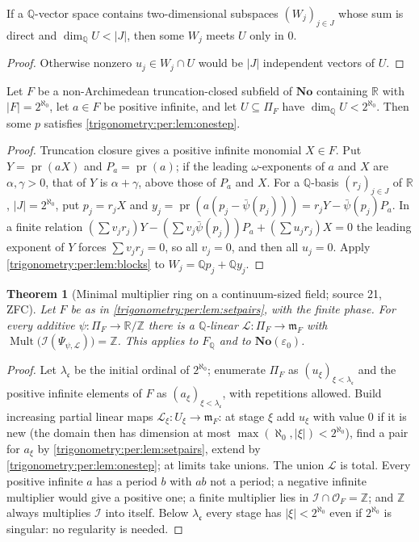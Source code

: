 \documentclass[11pt,letterpaper]{article}
\numberwithin{equation}{section}
\newtheorem{theorem}{Theorem}[section]
\theoremstyle{definition}
\theoremstyle{remark}
\newcommand{\No}{\mathbf{No}}
\newcommand{\R}{\mathbb R}
\newcommand{\Q}{\mathbb Q}
\newcommand{\Z}{\mathbb Z}
\newcommand{\OO}{\mathcal O}
\newcommand{\mm}{\mathfrak m}
\newcommand{\eps}{\varepsilon}
\newcommand{\Mult}{\operatorname{Mult}}
\newcommand{\pr}{\operatorname{pr}}
\newcommand{\cI}{\mathcal I}
\newcommand{\cL}{\mathcal L}
\begin{document}
\begin{lemma}\label{trigonometry:per:lem:blocks}
If a $\Q$-vector space contains two-dimensional subspaces $(W_j)_{j\in J}$ whose sum is direct and
$\dim_{\Q}U<|J|$, then some $W_j$ meets $U$ only in $0$.
\end{lemma}
\begin{proof}
Otherwise nonzero $u_j\in W_j\cap U$ would be $|J|$ independent vectors of $U$.
\end{proof}

\begin{lemma}\label{trigonometry:per:lem:setpairs}
Let $F$ be a non-Archimedean truncation-closed subfield of $\No$ containing $\R$ with
$|F|=2^{\aleph_0}$, let $a\in F$ be positive infinite, and let $U\subseteq\Pi_F$ have
$\dim_{\Q}U<2^{\aleph_0}$. Then some $p$ satisfies \cref{trigonometry:per:lem:onestep}.
\end{lemma}
\begin{proof}
Truncation closure gives a positive infinite monomial $X\in F$. Put $Y=\pr(aX)$ and $P_a=\pr(a)$; if the
leading $\omega$-exponents of $a$ and $X$ are $\alpha,\gamma>0$, that of $Y$ is $\alpha+\gamma$, above
those of $P_a$ and $X$. For a $\Q$-basis $(r_j)_{j\in J}$ of $\R$, $|J|=2^{\aleph_0}$, put $p_j=r_jX$ and
$y_j=\pr(a(p_j-\bar\psi(p_j)))=r_jY-\bar\psi(p_j)P_a$. In a finite relation
$(\sum v_jr_j)Y-(\sum v_j\bar\psi(p_j))P_a+(\sum u_jr_j)X=0$ the leading exponent of $Y$ forces
$\sum v_jr_j=0$, so all $v_j=0$, and then all $u_j=0$. Apply
\cref{trigonometry:per:lem:blocks} to $W_j=\Q p_j+\Q y_j$.
\end{proof}

\begin{theorem}[Minimal multiplier ring on a continuum-sized field; source 21, ZFC]
\label{trigonometry:per:thm:minimalset}
Let $F$ be as in \cref{trigonometry:per:lem:setpairs}, with the finite phase. For every additive
$\psi:\Pi_F\to\R/\Z$ there is a $\Q$-linear $\cL:\Pi_F\to\mm_F$ with
$\Mult\bigl(\cI(\Psi_{\psi,\cL})\bigr)=\Z$. This applies to $F_{\Q}$ and to $\No(\eps_0)$.
\end{theorem}
\begin{proof}
Let $\lambda_{\mathfrak c}$ be the initial ordinal of $2^{\aleph_0}$; enumerate $\Pi_F$ as
$(u_\xi)_{\xi<\lambda_{\mathfrak c}}$ and the positive infinite elements of $F$ as
$(a_\xi)_{\xi<\lambda_{\mathfrak c}}$, with repetitions allowed. Build increasing partial linear maps
$\cL_\xi:U_\xi\to\mm_F$: at stage $\xi$ add $u_\xi$ with value $0$ if it is new (the domain then has
dimension at most $\max(\aleph_0,|\xi|)<2^{\aleph_0}$), find a pair for $a_\xi$ by
\cref{trigonometry:per:lem:setpairs}, extend by \cref{trigonometry:per:lem:onestep}; at limits take
unions. The union $\cL$ is total. Every positive infinite $a$ has a period $b$ with $ab$ not a period;
a negative infinite multiplier would give a positive one; a finite multiplier lies in
$\cI\cap\OO_F=\Z$; and $\Z$ always multiplies $\cI$ into itself. Below $\lambda_{\mathfrak c}$ every
stage has $|\xi|<2^{\aleph_0}$ even if $2^{\aleph_0}$ is singular: no regularity is needed.
\end{proof}
\end{document}
